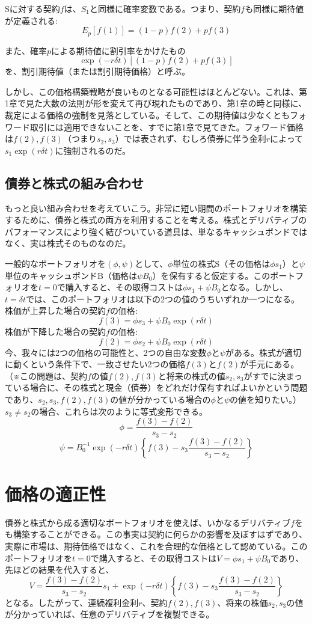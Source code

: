 \documentclass[uplatex,a4j,12pt,dvipdfmx]{jsarticle}
\begin{document}
Sに対する契約$f$は、$S_1$と同様に確率変数である。つまり、契約$f$も同様に期待値が定義される: \[E_p[f(1)] = (1-p)f(2) + pf(3)\]

また、確率$p$による期待値に割引率をかけたもの\[\exp(-r\delta t)[(1-p)f(2) + pf(3)]\]を、割引期待値（または割引期待価格）と呼ぶ。

しかし、この価格構築戦略が良いものとなる可能性はほとんどない。これは、第1章で見た大数の法則が形を変えて再び現れたものであり、第1章の時と同様に、裁定による価格の強制を見落としている。そして、この期待値は少なくともフォワード取引には適用できないことを、すでに第1章で見てきた。フォワード価格は$f(2), f(3)$（つまり$s_2, s_3$）では表されず、むしろ債券に伴う金利$r$によって$s_1 \exp(r\delta t)$に強制されるのだ。

\subsection{債券と株式の組み合わせ}
もっと良い組み合わせを考えていこう。非常に短い期間のポートフォリオを構築するために、債券と株式の両方を利用することを考える。株式とデリバティブのパフォーマンスにより強く結びついている道具は、単なるキャッシュボンドではなく、実は株式そのものなのだ。

一般的なポートフォリオを$(\phi, \psi)$として、$\phi$単位の株式S（その価格は$\phi s_1$）と$\psi$単位のキャッシュボンドB（価格は$\psi B_0$）を保有すると仮定する。このポートフォリオを$t=0$で購入すると、その取得コストは$\phi s_1 + \psi B_0$となる。しかし、$t=\delta t$では、このポートフォリオは以下の2つの値のうちいずれか一つになる。
株価が上昇した場合の契約$f$の価格: \[f(3) = \phi s_3 + \psi B_0\exp(r\delta t)\]
株価が下降した場合の契約$f$の価格: \[f(2) = \phi s_2 + \psi B_0\exp(r\delta t)\]
今、我々には2つの価格の可能性と、2つの自由な変数$\phi$と$\psi$がある。株式が適切に動くという条件下で、一致させたい2つの価格$f(3)$と$f(2)$が手元にある。（※この問題は、契約$f$の値$f(2), f(3)$と将来の株式の値$s_2, s_3$がすでに決まっている場合に、その株式と現金（債券）をどれだけ保有すればよいかという問題であり、$s_2, s_3, f(2), f(3)$の値が分かっている場合の$\phi$と$\psi$の値を知りたい。）$s_3 \neq s_2$の場合、これらは次のように等式変形できる。
\[\phi = \frac{f(3) - f(2)}{s_3 - s_2}\]
\[\psi = B_0^{-1} \exp(-r\delta t) \left\{ f(3) - s_3 \frac{f(3) - f(2)}{s_3 - s_2} \right\}\]

\section{価格の適正性}
債券と株式から成る適切なポートフォリオを使えば、いかなるデリバティブ$f$をも構築することができる。この事実は契約に何らかの影響を及ぼすはずであり、実際に市場は、期待価格ではなく、これを合理的な価格として認めている。このポートフォリオを$t=0$で購入すると、その取得コストは$V = \phi s_1 + \psi B_0$であり、先ほどの結果を代入すると、
\[V = \frac{f(3) - f(2)}{s_3 - s_2} s_1 + \exp(-r\delta t) \left\{ f(3) - s_3 \frac{f(3) - f(2)}{s_3 - s_2} \right\}\]
となる。したがって、連続複利金利$r$、契約$f(2), f(3)$、将来の株価$s_2, s_3$の値が分かっていれば、任意のデリバティブを複製できる。
\end{document}
